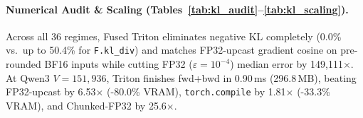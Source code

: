 \documentclass[10pt]{article}
\begin{document}
\begin{table}[t]
  \centering
  \caption{Real 200-step 3-seed BF16 RLHF on Qwen3-1.7B ($V=151{{,}}936, \beta=2.0$, trainable top-4 blocks + rank-16 LoRA + full LM head, 512 real tokens/step).}
  \label{tab:kl_qwen200}
  \scriptsize
\end{table}


\paragraph{Numerical Audit \& Scaling (Tables~\ref{tab:kl_audit}--\ref{tab:kl_scaling}).} Across all 36 regimes, Fused Triton eliminates negative KL completely (0.0\% vs.\ up to 50.4\% for \texttt{F.kl\_div}) and matches FP32-upcast gradient cosine on pre-rounded BF16 inputs while cutting FP32 ($\varepsilon=10^{-4}$) median error by 149,111$\times$. At Qwen3 $V=151{,}936$, Triton finishes fwd+bwd in 0.90\,ms (296.8\,MB), beating FP32-upcast by 6.53$\times$ (-80.0\% VRAM), \texttt{torch.compile} by 1.81$\times$ (-33.3\% VRAM), and Chunked-FP32 by 25.6$\times$.
\end{document}
